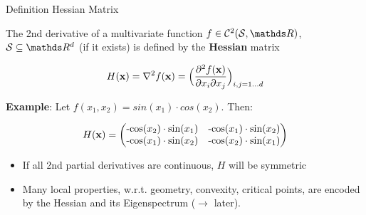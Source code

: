 \begin{vbframe}{Definition Hessian Matrix}

The 2nd derivative of a multivariate function $f \in \mathcal{C}^2(\mathcal{S}, \R)$, $\mathcal{S}\subseteq \R^d$ (if it exists) is defined by the \textbf{Hessian} matrix

  \[ H(\mathbf{x}) =\nabla^2 f(\mathbf{x}) =
  \Bigl(\frac{\partial^2 f(\mathbf{x})}{\partial x_i \partial x_j}\Bigr)_{i,j=1\ldots d}\]
  
\lz 

\textbf{Example}: Let $f(x_1,x_2) = sin(x_1) \cdot cos(x_2)$. Then:

$$
H(\mathbf{x}) = \begin{pmatrix}
\text{-cos}(x_2)\cdot\text{sin}(x_1) & \text{-cos}(x_1)\cdot\text{sin}(x_2) 
\\ \text{-cos}(x_1)\cdot\text{sin}(x_2) & \text{-cos}(x_2)\cdot\text{sin}(x_1) 
\end{pmatrix}
$$

\begin{itemize}
    \item If all 2nd partial derivatives are continuous, $H$ will be symmetric
    \item Many local properties, w.r.t. geometry, convexity, critical points, 
    are encoded by the Hessian and its Eigenspectrum ($\rightarrow$ later).
\end{itemize}

\end{vbframe}

